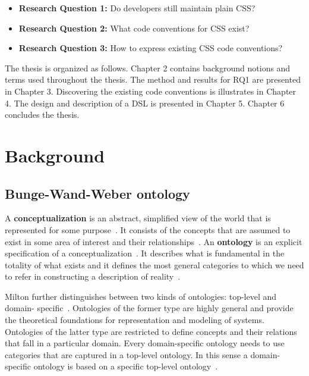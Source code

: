 \documentclass[parskip=full]{uvamscse}
\begin{document}
  \begin{itemize}
    \item \textbf{Research Question 1:} Do developers still maintain plain CSS?
    \item \textbf{Research Question 2:} What code conventions for CSS exist?
    \item \textbf{Research Question 3:} How to express existing CSS code conventions?
  \end{itemize}

The thesis is organized as follows. Chapter 2 contains background notions and terms used throughout
the thesis. The method and results for RQ1 are presented in Chapter 3. Discovering the existing code
conventions is illustrates in Chapter 4. The design and description of a DSL is presented in Chapter
5. Chapter 6 concludes the thesis.



\chapter{Background}

\section{Bunge-Wand-Weber ontology}

A \textbf{conceptualization} is an abstract, simplified view of the world that is represented for
some purpose~\cite{gruber1995toward}. It consists of the concepts that are assumed to exist in some
area of interest and their relationships~\cite{gruber1995toward}. An \textbf{ontology} is an
explicit specification of a conceptualization~\cite{gruber1995toward}. It describes what is
fundamental in the totality of what exists and it defines the most general categories to which we
need to refer in constructing a description of reality~\cite{milton2004top}.

Milton further distinguishes between two kinds of ontologies: top-level and domain-
specific~\cite{milton2004top}. Ontologies of the former type are highly general and provide the
theoretical foundations for representation and modeling of systems. Ontologies of the latter type
are restricted to define concepts and their relations that fall in a particular domain. Every
domain-specific ontology needs to use categories that are captured in a top-level ontology. In this
sense a domain-specific ontology is based on a specific top-level ontology~\cite{milton2004top}.
\end{document}

